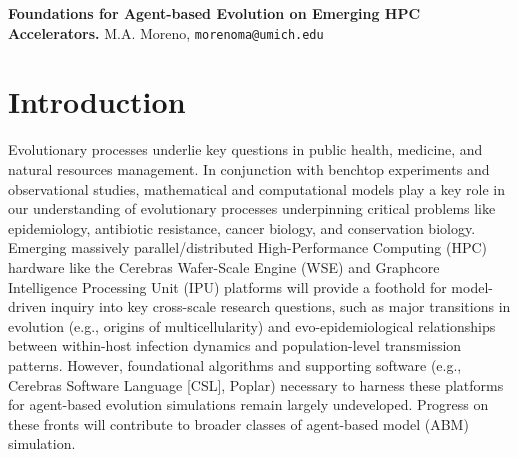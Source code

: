 

\noindent
\textbf{Foundations for Agent-based Evolution on Emerging HPC Accelerators.}
M.A. Moreno, \texttt{morenoma@umich.edu}

\section{Introduction}
Evolutionary processes underlie key questions in public health, medicine, and natural resources management.
In conjunction with benchtop experiments and observational studies, mathematical and computational models play a key role in our understanding of evolutionary processes underpinning critical problems like epidemiology, antibiotic resistance, cancer biology, and conservation biology.
Emerging massively parallel/distributed High-Performance Computing (HPC) hardware like the Cerebras Wafer-Scale Engine (WSE) and Graphcore Intelligence Processing Unit (IPU) platforms will provide a foothold for model-driven inquiry into key cross-scale research questions, such as major transitions in evolution (e.g., origins of multicellularity) and evo-epidemiological relationships between within-host infection dynamics and population-level transmission patterns.
However, foundational algorithms and supporting software (e.g., Cerebras Software Language [CSL], Poplar) necessary to harness these platforms for agent-based evolution simulations remain largely undeveloped.
Progress on these fronts will contribute to broader classes of agent-based model (ABM) simulation.

